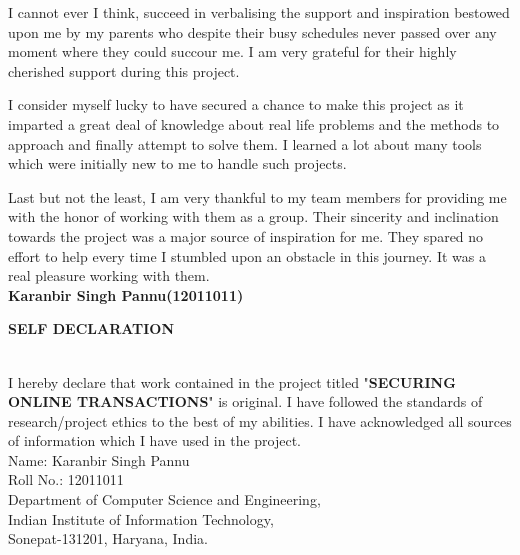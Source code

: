 \documentclass[12pt, oneside, a4paper]{article}
\begin{document}
I cannot ever I think, succeed in verbalising the support and inspiration bestowed upon me by my parents who despite their busy schedules never passed over any moment where they could succour me. I am very grateful for their highly cherished support during this project.

I consider myself lucky to have secured a chance to make this project as it imparted a great deal of knowledge about real life problems and the methods to approach and finally attempt to solve them. I learned a lot about many tools which were initially new to me to handle such projects. 

Last but not the least, I am very thankful to my team members for providing me with the honor of working with them as a group. Their sincerity and inclination towards the project was a major source of inspiration for me. They spared no effort to help every time I stumbled upon an obstacle in this journey. It was a real pleasure working with them.
\vspace{2cm}\\
\textbf{Karanbir Singh Pannu(12011011)}
\setcounter{page}{2}
\pagebreak

\begin{center}
    \begin{Large}\textbf{SELF DECLARATION}\end{Large}
\end{center}\\
\vspace{1cm}
I hereby declare that work contained in the project titled "\textbf{SECURING ONLINE TRANSACTIONS}" is original. I have followed the standards of research/project ethics to the best of my abilities. I have acknowledged all sources of information which I have used in the project.
\vspace{4cm}\\
Name: Karanbir Singh Pannu\\
Roll No.: 12011011\\
Department of Computer Science and Engineering,\\
Indian Institute of Information Technology,\\
Sonepat-131201, Haryana, India.
\pagebreak
\end{document}
